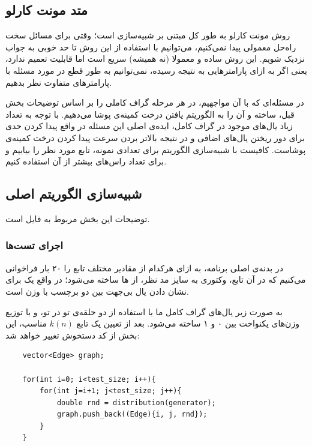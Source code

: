 \documentclass{article}
\begin{document}
\subsection{متد مونت کارلو}
روش مونت کارلو به طور کل مبتنی بر شبیه‌سازی است؛ وقتی برای مسائل سخت راه‌حل معمولی پیدا نمی‌کنیم، می‌توانیم با استفاده از این روش تا حد خوبی به جواب نزدیک شویم. این روش ساده و معمولا (نه همیشه) سریع است اما قابلیت تعمیم ندارد، یعنی اگر به ازای پارامترهایی به نتیجه رسیده، نمی‌توانیم به طور قطع در مورد مسئله با پارامترهای متفاوت نظر بدهیم.

در مسئله‌ای که با آن مواجهیم، در هر مرحله گراف کاملی را بر اساس توضیحات بخش قبل، ساخته و آن را به الگوریتم یافتن درخت کمینه‌ی پوشا می‌دهیم.
با توجه به تعداد زیاد یال‌های موجود در گراف کامل، ایده‌ی اصلی این مسئله در واقع پیدا کردن حدی برای دور ریختن یال‌های اضافی و در نتیجه بالاتر بردن سرعت پیدا کردن درخت کمینه‌ی پوشاست. کافیست با شبیه‌سازی الگوریتم برای تعدادی نمونه، تابع مورد نظر را بیابیم و برای تعداد راس‌های بیشتر از آن استفاده کنیم.
\subsection{شبیه‌سازی الگوریتم اصلی}
توضیحات این بخش مربوط به فایل
است.
\subsubsection{اجرای تست‌ها}
در بدنه‌ی اصلی برنامه، به ازای هرکدام از مقادیر مختلف
تابع
را ۲۰ بار فراخوانی می‌کنیم که در آن تابع، وکتوری به سایز مد نظر، از
ها ساخته می‌شود؛
در واقع یک
برای نشان دادن یال بی‌جهت بین دو برچسب
با وزن
است.

به صورت زیر یال‌های گراف کامل ما با استفاده از دو حلقه‌ی تو در تو، و با توزیع وزن‌های یکنواخت بین ۰ و ۱ ساخته می‌شود. بعد از تعیین یک تابع
$k(n)$
مناسب، این بخش از کد دستخوش تغییر خواهد شد:

\begin{latin} 
\begin{verbatim}
    vector<Edge> graph;

    for(int i=0; i<test_size; i++){
        for(int j=i+1; j<test_size; j++){
            double rnd = distribution(generator);
            graph.push_back((Edge){i, j, rnd});
        }
    }
\end{verbatim}
\end{latin}
\end{document}
